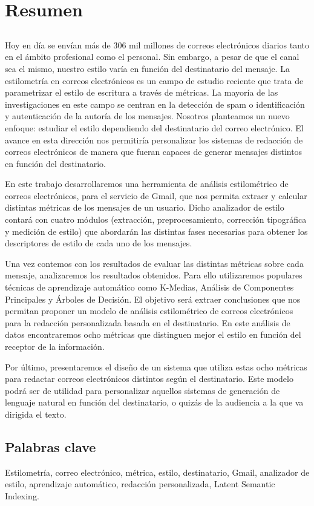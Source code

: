\chapter*{Resumen}

\section*{\tituloPortadaVal}

Hoy en día se envían más de 306 mil millones de correos electrónicos diarios tanto en el ámbito profesional como el personal. Sin embargo, a pesar de que el canal sea el mismo, nuestro estilo varía en función del destinatario del mensaje. La estilometría en correos electrónicos es un campo de estudio reciente que trata de parametrizar el estilo de escritura a través de métricas. La mayoría de las investigaciones en este campo se centran en la detección de spam o identificación y autenticación de la autoría de los mensajes. Nosotros planteamos un nuevo enfoque: estudiar el estilo dependiendo del destinatario del correo electrónico. El avance en esta dirección nos permitiría personalizar los sistemas de redacción de correos electrónicos de manera que fueran capaces de generar mensajes distintos en función del destinatario.

En este trabajo desarrollaremos una herramienta de análisis estilométrico de correos electrónicos, para el servicio de Gmail, que nos permita extraer y calcular distintas métricas de los mensajes de un usuario. Dicho analizador de estilo contará con cuatro módulos (extracción, preprocesamiento, corrección tipográfica y medición de estilo) que abordarán las distintas fases necesarias para obtener los descriptores de estilo de cada uno de los mensajes.

Una vez contemos con los resultados de evaluar las distintas métricas sobre cada mensaje, analizaremos los resultados obtenidos. Para ello utilizaremos populares técnicas de aprendizaje automático como K-Medias, Análisis de Componentes Principales y Árboles de Decisión. El objetivo será extraer conclusiones que nos permitan proponer un modelo de análisis estilométrico de correos electrónicos para la redacción personalizada basada en el destinatario. En este análisis de datos encontraremos ocho métricas que distinguen mejor el estilo en función del receptor de la información.

Por último, presentaremos el diseño de un sistema que utiliza estas ocho métricas para redactar correos electrónicos distintos según el destinatario. Este modelo podrá ser de utilidad para personalizar aquellos sistemas de generación de lenguaje natural en función del destinatario, o quizás de la audiencia a la que va dirigida el texto.

\section*{Palabras clave}
   
\noindent Estilometría, correo electrónico, métrica, estilo, destinatario, Gmail, analizador de estilo, aprendizaje automático, redacción personalizada, Latent Semantic Indexing.

   


